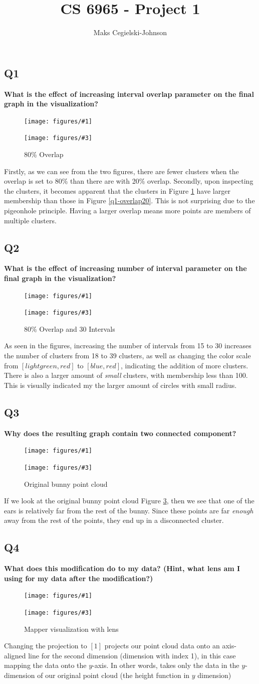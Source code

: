 \documentclass[12pt]{article}
\title{CS 6965 - Project 1}
\author{Maks Cegielski-Johnson}
\newcommand{\problem}[2]{
	\subsection*{#1}
	\textbf{#2}
}
\newcommand{\doubleimage}[5]{
\begin{figure}[H]
	\centering
	\begin{minipage}{#5\textwidth}
		\centering
		\texttt{[image: figures/\#1]}
		\caption{#2}
		\label{#1}
	\end{minipage}%
	\begin{minipage}{#5\textwidth}
		\centering
		\texttt{[image: figures/\#3]}
		\caption{#4}
		\label{#3}
	\end{minipage}
\end{figure}
}
\begin{document}
\maketitle

\problem{Q1}{What is the effect of increasing interval overlap parameter on the final graph in the visualization?}


\doubleimage{q1-overlap20}{20\% Overlap}{q1-overlap80}{80\% Overlap}{0.5}

Firstly, as we can see from the two figures, there are fewer clusters when the overlap is set to 80\% than there are with 20\% overlap. Secondly, upon inspecting the clusters, it becomes apparent that the clusters in Figure \ref{q1-overlap80} have larger membership than those in Figure \ref{q1-overlap20}. This is not surprising due to the pigeonhole principle. Having a larger overlap means more points are members of multiple clusters. 

\problem{Q2}{What is the effect of increasing number of interval parameter on the final graph in the visualization?}

\doubleimage{q1-overlap80}{80\% Overlap and 15 Intervals}{q2-interval30}{80\% Overlap and 30 Intervals}{0.5}

As seen in the figures, increasing the number of intervals from 15 to 30 increases the number of clusters from 18 to 39 clusters, as well as changing the color scale from $[lightgreen, red]$ to $[blue,red]$, indicating the addition of more clusters. There is also a larger amount of \textit{small} clusters, with membership less than 100. This is visually indicated my the larger amount of circles with small radius. 

\problem{Q3}{Why does the resulting graph contain two connected component?}

\doubleimage{q3-mapper}{Mapper visualization of bunny}{q3-bunny}{Original bunny point cloud}{0.5}

If we look at the original bunny point cloud Figure \ref{q3-bunny}, then we see that one of the ears is relatively far from the rest of the bunny. Since these points are far \textit{enough} away from the rest of the points, they end up in a disconnected cluster. 

\problem{Q4}{What does this modification do to my data? (Hint, what lens am I using for my data after the modification?)}

\doubleimage{q3-mapper}{Mapper visualization of bunny}{q4-lens}{Mapper visualization with lens}{0.5}

Changing the projection to $[1]$ projects our point cloud data onto an axis-aligned line for the second dimension (dimension with index 1), in this case mapping the data onto the $y$-axis. In other words, takes only the data in the $y$-dimension of our original point cloud (the height function in $y$ dimension)
\end{document}
